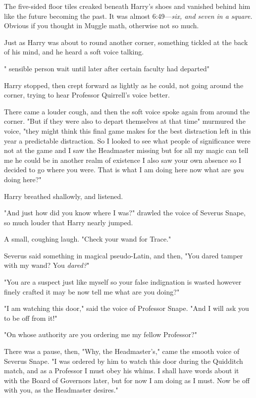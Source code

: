 The five-sided floor tiles creaked beneath Harry's shoes and vanished behind
him like the future becoming the past. It was almost 6:49—\emph{six, and seven
in a square.} Obvious if you thought in Muggle math, otherwise not so much.

Just as Harry was about to round another corner, something tickled at the back
of his mind, and he heard a soft voice talking.

"{\el} sensible person{\el} wait until later{\el} after certain faculty
had departed{\el}"

Harry stopped, then crept forward as lightly as he could, not going around the
corner, trying to hear Professor Quirrell's voice better.

There came a louder cough, and then the soft voice spoke again from around the
corner. "But if they were also{\el} to depart themselves{\el} at that
time{\el}" murmured the voice, "they might think{\el} this final
game{\el} makes for the best distraction{\el} left in this year{\el} a
predictable distraction. So I looked{\el} to see what people of
significance{\el} were not at the game{\el} and I saw the Headmaster
missing{\el} but for all my magic can tell me{\el} he could be in
another{\el} realm of existence{\el} I also saw your own absence{\el}
so I decided to go{\el} where you were. That is what I am doing here{\el}
now{\el} what are \emph{you} doing here?"

Harry breathed shallowly, and listened.

"And just how did you know where I was?" drawled the voice of Severus Snape, so
much louder that Harry nearly jumped.

A small, coughing laugh. "Check your wand{\el} for Trace."

Severus said something in magical pseudo-Latin, and then, "You dared tamper
with my wand? You \emph{dared?}"

"You are a suspect{\el} just like myself{\el} so your false indignation
is wasted{\el} however finely crafted it may be{\el} now tell me{\el}
what are you doing?"

"I am watching this door," said the voice of Professor Snape. "And I will ask
you to be off from it!"

"On whose authority{\el} are you ordering me{\el} my fellow Professor?"

There was a pause, then, "Why, the Headmaster's," came the smooth voice of
Severus Snape. "I was ordered by him to watch this door during the Quidditch
match, and as a Professor I must obey his whims. I shall have words about it
with the Board of Governors later, but for now I am doing as I must. Now be off
with you, as the Headmaster desires."

